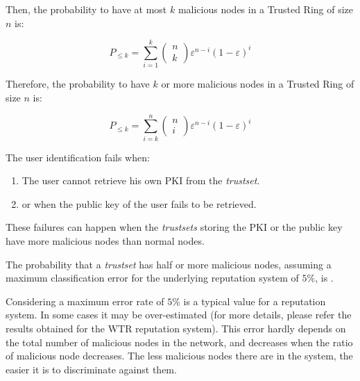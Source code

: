 Then, the probability to have at most $k$ malicious
nodes in a Trusted Ring of size $n$ is:

$$
P_{\leq k} = \sum^{k}_{i=1} \left(\!
                                \begin{array}{c}
                                    n\\
                                    k
                                  \end{array}
                            \!\right)              
                    \varepsilon^{n-i} ( 1 - \varepsilon )^i
$$

Therefore, the probability to have $k$ or more malicious
nodes in a Trusted Ring of size $n$ is:

$$
P_{\leq k} = \sum^{n}_{i=k} \left(\!
                                \begin{array}{c}
                                    n\\
                                    i
                                  \end{array}
                            \!\right)              
                    \varepsilon^{n-i} ( 1 - \varepsilon )^i
$$

The user identification fails when:
\begin{enumerate}
  \item The user cannot retrieve his own PKI from the \textit{trustset}.
  \item or when the public key of the user fails to be retrieved.
\end{enumerate}

These failures can happen when the \textit{trustsets} storing the PKI or the public
key have more malicious nodes than normal nodes.

The probability that a \textit{trustset} has half or more malicious nodes, assuming a maximum
classification error for the underlying reputation system
of $5\%$, is .%

Considering a maximum error rate of $5\%$ is a typical
value for a reputation system. In some cases it may be
over-estimated (for more details, please refer the results
obtained for the WTR reputation system\cite{wrt_reputation_system}). This
error hardly depends on the total number of malicious
nodes in the network, and decreases when the ratio
of malicious node decreases. The less malicious nodes
there are in the system, the easier it is to discriminate
against them.



